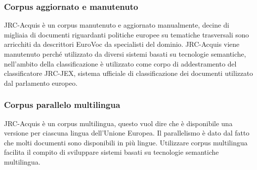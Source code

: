 \documentclass{article}
\theoremstyle{plain}
\theoremstyle{definition}
\begin{document}
\subsubsection{Corpus aggiornato e manutenuto}
JRC-Acquis è un corpus manutenuto e aggiornato manualmente, decine di migliaia di documenti riguardanti politiche europee su tematiche trasversali sono arricchiti da descrittori EuroVoc da specialisti del dominio. JRC-Acquis viene manutenuto perché utilizzato da diversi sistemi basati su tecnologie semantiche, nell'ambito della classificazione è utilizzato come corpo di addestramento del classificatore JRC-JEX, sistema ufficiale di classificazione dei documenti utilizzato dal parlamento europeo.

\subsubsection{Corpus parallelo multilingua}
JRC-Acquis è un corpus multilingua, questo vuol dire che è disponibile una versione per ciascuna lingua dell'Unione Europea. Il parallelismo è dato dal fatto che molti documenti sono disponibili in più lingue. Utilizzare corpus multilingua facilita il compito di sviluppare sistemi basati su tecnologie semantiche multilingua.

\newpage
\end{document}
